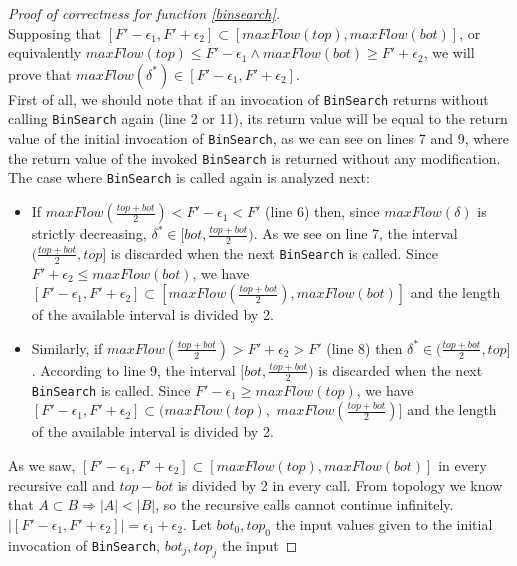 \documentclass[11pt]{article}
\theoremstyle{definition}
\theoremstyle{corollary}
\theoremstyle{lemma}
\begin{document}
    \begin{proof}[Proof of correctness for function \ref{binsearch}] \ \\
       Supposing that $[F' - \epsilon_1, F' + \epsilon_2] \subset [maxFlow(top),maxFlow(bot)]$, or equivalently
       $maxFlow(top) \leq F' - \epsilon_1 \wedge maxFlow(bot) \geq F' + \epsilon_2$, we will prove that
       $maxFlow(\delta^*) \in [F' - \epsilon_1, F' + \epsilon_2]$. \\
       First of all, we should note that if an invocation of \texttt{BinSearch} returns without calling
       \texttt{BinSearch} again (line 2 or 11), its return value will be equal to the return value of the initial invocation
       of \texttt{BinSearch}, as we can see on lines 7 and 9, where the return value of the invoked \texttt{BinSearch}
       is returned without any modification. The case where \texttt{BinSearch} is called again is analyzed next:
       \begin{itemize}
          \item If $maxFlow(\frac{top+bot}{2}) < F' - \epsilon_1 < F'$ (line 6) then, since $maxFlow(\delta)$ is strictly
          decreasing, $\delta^* \in [bot,\frac{top+bot}{2})$. As we see on line 7, the interval $(\frac{top+bot}{2}, top]$
          is discarded when the next \texttt{BinSearch} is called. Since $F' + \epsilon_2 \leq maxFlow(bot)$, we have
          $[F' - \epsilon_1, F' + \epsilon_2] \subset [maxFlow(\frac{top+bot}{2}), maxFlow(bot)]$ and
          the length of the available interval is divided by 2.
          \item Similarly, if $maxFlow(\frac{top+bot}{2}) > F' + \epsilon_2 > F'$ (line 8) then $\delta^* \in
          (\frac{top+bot}{2}, top]$. According to line 9, the interval $[bot, \frac{top+bot}{2})$ is discarded when the next
          \texttt{BinSearch} is called. Since $F'- \epsilon_1 \geq maxFlow(top)$, we have $[F' - \epsilon_1, F' + \epsilon_2]
          \subset (maxFlow(top),$ $maxFlow(\frac{top+bot}{2})]$ and the length of the available interval is divided by 2.
       \end{itemize}
       As we saw, $[F' - \epsilon_1, F' + \epsilon_2] \subset [maxFlow(top),maxFlow(bot)]$ in every recursive call and
       $top - bot$ is divided by 2 in every call. From topology we know that $A \subset B \Rightarrow |A| < |B|$, so the
       recursive calls cannot continue infinitely. $|[F' - \epsilon_1, F' + \epsilon_2]| = \epsilon_1 + \epsilon_2$. Let
       $bot_0, top_0$ the input values given to the initial invocation of \texttt{BinSearch}, $bot_j,top_j$ the input

\end{proof}
\end{document}
